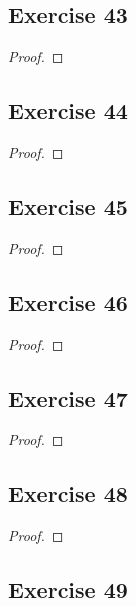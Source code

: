 \documentclass[14pt]{extarticle}
\begin{document}
\subsection{Exercise 43}

\begin{proof}

\end{proof}

\subsection{Exercise 44}

\begin{proof}

\end{proof}

\subsection{Exercise 45}

\begin{proof}

\end{proof}

\subsection{Exercise 46}

\begin{proof}

\end{proof}

\subsection{Exercise 47}

\begin{proof}

\end{proof}

\subsection{Exercise 48}

\begin{proof}

\end{proof}

\subsection{Exercise 49}
\end{document}
